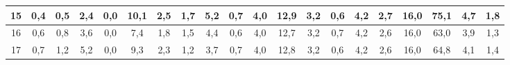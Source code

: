 \begin{sidewaystable}[]
\begin{tabular}{|c|c|c|c|c|c|c|c|c|c|c|c|c|c|c|c|c|c|c|c|}
    15 & 0,4                                             & 0,5                                             & 2,4                                             & 0,0                                             & 10,1                                             & 2,5                                              & 1,7                                              & 5,2                                              & 0,7                                              & 4,0                                              & 12,9                                             & 3,2                                              & 0,6                                              & 4,2                                              & 2,7                                              & 16,0                                             & 75,1                                             & 4,7                                              & 1,8                                              \\ \hline
    16 & 0,6                                             & 0,8                                             & 3,6                                             & 0,0                                             & 7,4                                              & 1,8                                              & 1,5                                              & 4,4                                              & 0,6                                              & 4,0                                              & 12,7                                             & 3,2                                              & 0,7                                              & 4,2                                              & 2,6                                              & 16,0                                             & 63,0                                             & 3,9                                              & 1,3                                              \\ \hline
    17 & 0,7                                             & 1,2                                             & 5,2                                             & 0,0                                             & 9,3                                              & 2,3                                              & 1,2                                              & 3,7                                              & 0,7                                              & 4,0                                              & 12,8                                             & 3,2                                              & 0,6                                              & 4,2                                              & 2,6                                              & 16,0                                             & 64,8                                             & 4,1                                              & 1,4                                              \\ \hline

\end{tabular}
\end{sidewaystable}
